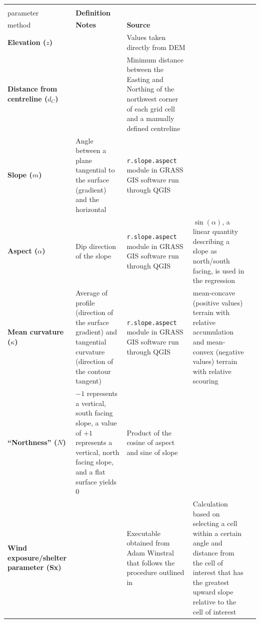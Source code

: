 \documentclass[twocolumn, letterpaper]{igs}
\begin{document}
\begin{table}[!htbp]
\centering%
\caption{}
\begin{tabularx}{\linewidth}{XXXXX}
\midrule
\textbf{\begin{tabular}[c]{@{}l@{}}Topographic\\ parameter\end{tabular}} & \textbf{Definition} & \textbf{\begin{tabular}[c]{@{}l@{}}Calculation \\ method\end{tabular}} & \textbf{Notes} & \textbf{Source} \\ \midrule
\textbf{Elevation ($z$)} &  & Values taken directly from DEM &  &  \\
\textbf{Distance from centreline ($d_C$)} &  & Minimum distance between the Easting and Northing of the northwest corner of each grid cell and a manually defined centreline &  &  \\
\textbf{Slope ($m$)} & Angle between a plane tangential to the surface (gradient) and the horizontal & \texttt{r.slope.aspect} module in GRASS GIS software run through QGIS &  & \cite{Mitavsova1993, Hofierka2009, Olaya2009} \\
\textbf{Aspect ($\alpha$)} & Dip direction of the slope & \texttt{r.slope.aspect} module in GRASS GIS software run through QGIS & $\sin(\alpha)$, a linear quantity describing a slope as north/south facing, is used in the regression & \cite{Mitavsova1993, Hofierka2009, Olaya2009} \\
\textbf{Mean curvature ($\kappa$)} & Average of profile (direction of the surface gradient) and tangential curvature (direction of the contour tangent) & \texttt{r.slope.aspect} module in GRASS GIS software run through QGIS & mean-concave (positive values) terrain with relative accumulation and mean-convex (negative values) terrain with relative scouring & \cite{Mitavsova1993, Hofierka2009, Olaya2009} \\
\textbf{``Northness'' ($N$)} & $-1$ represents a vertical, south facing slope, a value of $+1$ represents a vertical, north facing slope, and a flat surface yields 0 & Product of the cosine of aspect and sine of slope &  & \cite{Molotch2005} \\
\textbf{Wind exposure/shelter parameter (Sx)} &  & Executable obtained from Adam Winstral that follows the procedure outlined in \cite{Winstral2002} & Calculation based on selecting a cell within a certain angle and distance from the cell of interest that has the greatest upward slope relative to the cell of interest & \cite{Winstral2002}
\end{tabularx}
\end{table}
\end{document}
